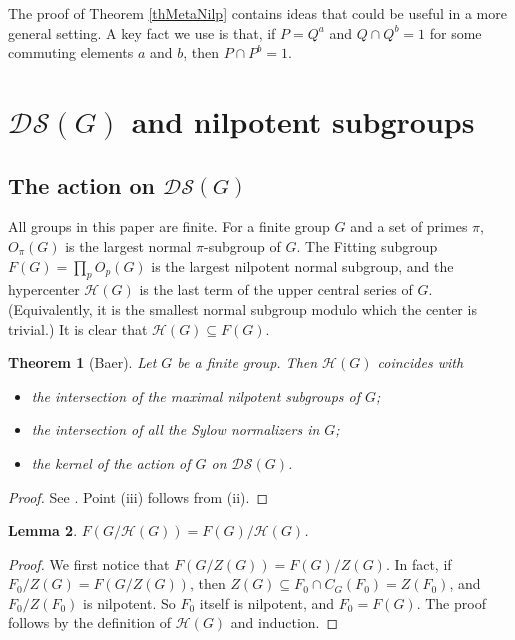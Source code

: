 \documentclass[11pt]{amsart}
\numberwithin{equation}{section}
\newtheorem{theorem}{Theorem}[section]
\newtheorem{lemma}[theorem]{Lemma}
\theoremstyle{definition}
\theoremstyle{remark}
\newcommand{\DS}{\mathcal{DS}}
\begin{document}
The proof of Theorem \ref{thMetaNilp}
contains ideas that could be useful in a more general setting.
A key fact we use is that, if $P=Q^a$ and $Q \cap Q^b =1$ for some commuting elements $a$ and $b$,
then $P \cap P^b =1$.





\vspace{0.1cm}
\section{$\DS(G)$ and nilpotent subgroups} \label{sec2}

\subsection{The action on $\DS(G)$}

All groups in this paper are finite.
For a finite group $G$ and a set of primes $\pi$, $O_\pi(G)$ is the largest normal $\pi$-subgroup of $G$.
The Fitting subgroup $F(G) = \prod_p O_p(G)$ is the largest nilpotent normal subgroup,
and the hypercenter $\mathcal{H}(G)$ is the last term of the upper central series of $G$.
(Equivalently, it is the smallest normal subgroup modulo which the center is trivial.)
It is clear that $\mathcal{H}(G) \subseteq F(G)$.

\begin{theorem}[Baer] \label{thHyper} 
Let $G$ be a finite group. Then $\mathcal{H}(G)$ coincides with
\begin{itemize} 
    \item[(i)] the intersection of the maximal nilpotent subgroups of $G$;
    \item[(ii)] the intersection of all the Sylow normalizers in $G$;
    \item[(iii)] the kernel of the action of $G$ on $\DS(G)$.
\end{itemize}
\end{theorem}
\begin{proof}
See \cite[Cor. 3-4]{Bae53}.
Point (iii) follows from (ii).
\end{proof}

\begin{lemma} \label{lemRedHyp}
$F(G/\mathcal{H}(G)) = F(G)/\mathcal{H}(G)$.
\end{lemma}
\begin{proof}
We first notice that $F(G/Z(G))=F(G)/Z(G)$.
In fact, if $F_0/Z(G) = F(G/Z(G))$,
then $Z(G) \subseteq F_0 \cap C_G(F_0) = Z(F_0)$, and $F_0/Z(F_0)$ is nilpotent.
So $F_0$ itself is nilpotent, and $F_0=F(G)$.
The proof follows by the definition of $\mathcal{H}(G)$ and induction.
\end{proof}
\end{document}
